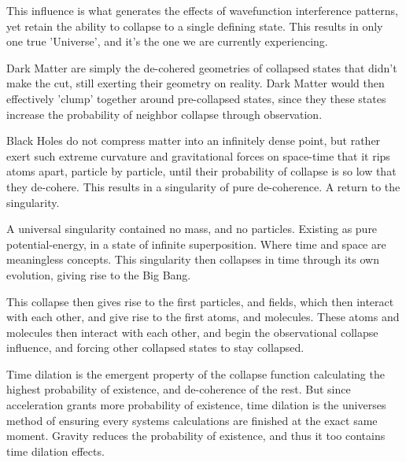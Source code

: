 \documentclass[11pt]{article}
\begin{document}
    This influence is what generates the effects of wavefunction interference patterns, yet retain the ability to collapse to a single defining state.
    This results in only one true 'Universe', and it's the one we are currently experiencing.

    Dark Matter are simply the de-cohered geometries of collapsed states that didn't make the cut, still exerting their geometry on reality.
    Dark Matter would then effectively 'clump' together around pre-collapsed states, since they these states increase the probability of neighbor collapse through observation.

    Black Holes do not compress matter into an infinitely dense point, but rather exert such extreme curvature and gravitational forces on space-time that it rips atoms apart, particle by particle, until their probability of collapse is so low that they de-cohere.
    This results in a singularity of pure de-coherence.
    A return to the singularity.

    A universal singularity contained no mass, and no particles.
    Existing as pure potential-energy, in a state of infinite superposition.
    Where time and space are meaningless concepts.
    This singularity then collapses in time through its own evolution, giving rise to the Big Bang.

    This collapse then gives rise to the first particles, and fields, which then interact with each other, and give rise to the first atoms, and molecules.
    These atoms and molecules then interact with each other, and begin the observational collapse influence, and forcing other collapsed states to stay collapsed.

    Time dilation is the emergent property of the collapse function calculating the highest probability of existence, and de-coherence of the rest.
    But since acceleration grants more probability of existence, time dilation is the universes method of ensuring every systems calculations are finished at the exact same moment.
    Gravity reduces the probability of existence, and thus it too contains time dilation effects.

\section{}

\end{document}

